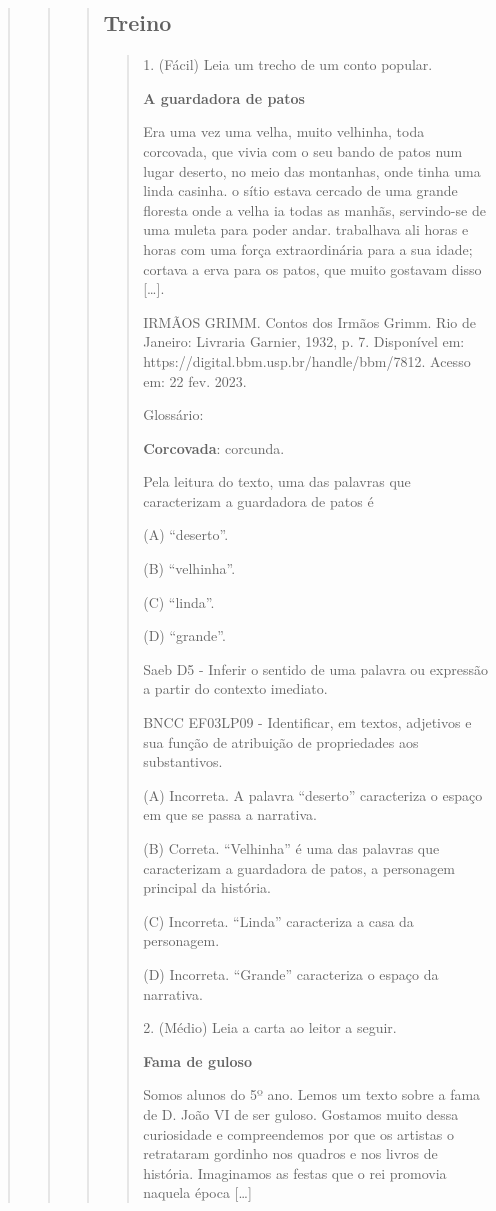 \begin{quote}
\begin{quote}
\begin{quote}
\subsection{Treino}\label{treino-6}

\begin{quote}
1. (Fácil) Leia um trecho de um conto popular.

\textbf{A guardadora de patos}

Era uma vez uma velha, muito velhinha, toda corcovada, que vivia com o
seu bando de patos num lugar deserto, no meio das montanhas, onde tinha
uma linda casinha. o sítio estava cercado de uma grande floresta onde a
velha ia todas as manhãs, servindo-se de uma muleta para poder andar.
trabalhava ali horas e horas com uma força extraordinária para a sua
idade; cortava a erva para os patos, que muito gostavam disso
{[}\ldots{}{]}.

IRMÃOS GRIMM. Contos dos Irmãos Grimm. Rio de Janeiro: Livraria Garnier,
1932, p. 7. Disponível em: https://digital.bbm.usp.br/handle/bbm/7812.
Acesso em: 22 fev. 2023.

Glossário:

\textbf{Corcovada}: corcunda.

Pela leitura do texto, uma das palavras que caracterizam a guardadora de
patos é

(A) ``deserto''.

(B) ``velhinha''.

(C) ``linda''.

(D) ``grande''.

Saeb D5 - Inferir o sentido de uma palavra ou expressão a partir do
contexto imediato.

BNCC EF03LP09 - Identificar, em textos, adjetivos e sua função de
atribuição de propriedades aos substantivos.

(A) Incorreta. A palavra ``deserto'' caracteriza o espaço em que se
passa a narrativa.

(B) Correta. ``Velhinha'' é uma das palavras que caracterizam a
guardadora de patos, a personagem principal da história.

(C) Incorreta. ``Linda'' caracteriza a casa da personagem.

(D) Incorreta. ``Grande'' caracteriza o espaço da narrativa.

2. (Médio) Leia a carta ao leitor a seguir.

\textbf{Fama de guloso}

Somos alunos do 5º ano. Lemos um texto sobre a fama de D. João VI de ser
guloso. Gostamos muito dessa curiosidade e compreendemos por que os
artistas o retrataram gordinho nos quadros e nos livros de história.
Imaginamos as festas que o rei promovia naquela época {[}\ldots{}{]}


\end{quote}
\end{quote}
\end{quote}
\end{quote}
